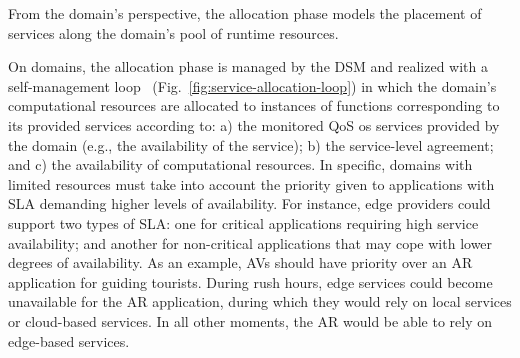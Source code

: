 From the domain's perspective, the allocation phase models the placement of services along the domain's pool of runtime resources. 

On domains, the allocation phase is managed by the DSM and realized with a self-management loop~\cite{kephart2003vision} (Fig.~\ref{fig:service-allocation-loop}) in which the domain's computational resources are allocated to instances of functions corresponding to its provided services according to: a) the monitored QoS os services provided by the domain (e.g., the availability of the service); b) the service-level agreement; and c) the availability of computational resources. In specific, domains with limited resources must take into account the priority given to applications with SLA demanding higher levels of availability. 
For instance, edge providers could support two types of SLA: one for critical applications requiring high service availability; and another for non-critical applications that may cope with lower degrees of availability. 
As an example, AVs should have priority over an AR application for guiding tourists. During rush hours, edge services could become unavailable for the AR application, during which they would rely on local services or cloud-based services. In all other moments, the AR would be able to rely on edge-based services. 



